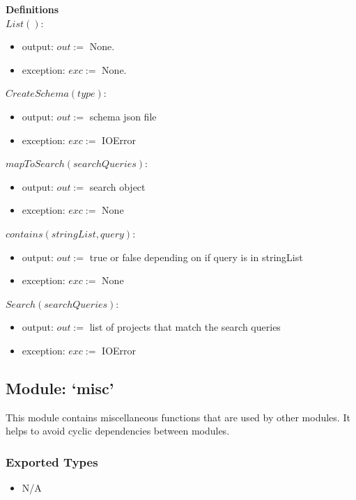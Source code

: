 \documentclass[11pt]{article}
\begin{document}
\vspace{2em}
\textbf{Definitions}\\

$List():$
\begin{itemize}
\item output: $out :=$ None.
\item exception: $exc :=$ None.
\end{itemize}

\vspace{1em}
$CreateSchema(type):$
\begin{itemize}
\item output: $out :=$ schema json file
\item exception: $exc :=$ IOError
\end{itemize}

$mapToSearch(searchQueries):$
\begin{itemize}
\item output: $out :=$ search object
\item exception: $exc :=$ None
\end{itemize}

$contains(stringList, query):$
\begin{itemize}
\item output: $out :=$ true or false depending on if query is in stringList
\item exception: $exc :=$ None
\end{itemize}

$Search(searchQueries):$
\begin{itemize}
\item output: $out :=$ list of projects that match the search queries
\item exception: $exc :=$ IOError
\end{itemize}

\subsection{Module: `misc'}
\label{mod:misc}
This module contains miscellaneous functions that are used by other modules. It helps to avoid cyclic dependencies between modules.

\subsubsection{Exported Types}
\begin{itemize}
\item N/A
\end{itemize}
\end{document}
